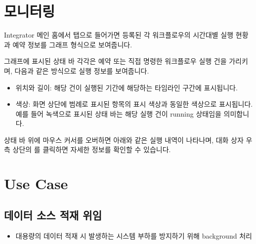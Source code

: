 \documentclass[letterpaper,10pt,english]{sphinxmanual}
\begin{document}
\chapter{모니터링}
\label{\detokenize{integrator/part04/index:id1}}\label{\detokenize{integrator/part04/index::doc}}
Integrator 메인 홈에서  탭으로 들어가면 등록된 각 워크플로우의 시간대별 실행 현황과 예약 정보를 그래프 형식으로 보여줍니다.
\begin{quote}

\begin{figure}[H]
\centering

\noindent{}
\end{figure}
\end{quote}

그래프에 표시된 상태 바 각각은 예약 또는 직접 명령한 워크플로우 실행 건을 가리키며, 다음과 같은 방식으로 실행 정보를 보여줍니다.
\begin{itemize}
\item {} 
위치와 길이: 해당 건이 실행된 기간에 해당하는 타임라인 구간에 표시됩니다.

\item {} 
색상: 화면 상단에 범례로 표시된  항목의 표시 색상과 동일한 색상으로 표시됩니다. 예를 들어 녹색으로 표시된 상태 바는 해당 실행 건이 running 상태임을 의미합니다.

\end{itemize}

상태 바 위에 마우스 커서를 오버하면 아래와 같은 실행 내역이 나타나며, 대화 상자 우측 상단의 를 클릭하면 자세한 정보를 확인할 수 있습니다.
\begin{quote}

\begin{figure}[H]
\centering

\noindent{}
\end{figure}
\end{quote}


\chapter{Use Case}
\label{\detokenize{integrator/part05/index:use-case}}\label{\detokenize{integrator/part05/index::doc}}

\section{데이터 소스 적재 위임}
\label{\detokenize{integrator/part05/index:id1}}\begin{itemize}
\item {} 
대용량의 데이터 적재 시 발생하는 시스템 부하를 방지하기 위해 background 처리

\end{itemize}
\end{document}
